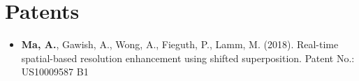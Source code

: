 \section*{Patents}
    \vspace{\postsubhead}
    \begin{adjustwidth}{\indentleft}{\indentright}
    \begin{itemize}
        \item \textbf{Ma, A.}, Gawish, A., Wong, A., Fieguth, P., Lamm, M. (2018). Real-time spatial-based resolution enhancement using shifted superposition. Patent No.: US10009587 B1
      \end{itemize}
    \end{adjustwidth}
    \vspace{\postsection}